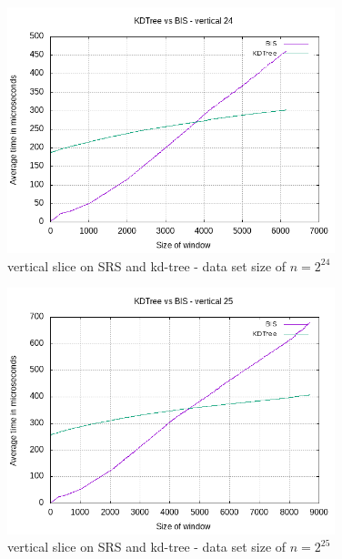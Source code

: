 \begin{figure}[h]
    \centering
    \includegraphics[width = 0.85\textwidth]{pictures/analysis/vert_24.png}
    \caption{vertical slice on SRS and kd-tree - data set size of $n=2^{24}$}\label{fig:vert_24}
\end{figure}

\begin{figure}[h]
    \centering
    \includegraphics[width = 0.85\textwidth]{pictures/analysis/vert_25.png}
    \caption{vertical slice on SRS and kd-tree - data set size of $n=2^{25}$}\label{fig:vert_25}
\end{figure}

\clearpage

